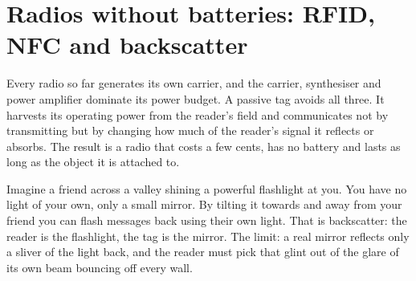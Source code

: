 
\section{Radios without batteries: RFID, NFC and backscatter}
\label{sec:ch22:rfid}

Every radio so far generates its own carrier, and the carrier, synthesiser and power amplifier
dominate its power budget. A passive tag avoids all three. It harvests its operating power from the
reader's field and communicates not by transmitting but by changing how much of the reader's signal
it reflects or absorbs. The result is a radio that costs a few cents, has no battery and lasts as long
as the object it is attached to.

\begin{analogy}
Imagine a friend across a valley shining a powerful flashlight at you. You have no light of your own,
only a small mirror. By tilting it towards and away from your friend you can flash messages back
using their own light. That is backscatter: the reader is the flashlight, the tag is the mirror.
The limit: a real mirror reflects only a sliver of the light back, and the reader must pick that
glint out of the glare of its own beam bouncing off every wall.
\end{analogy}


